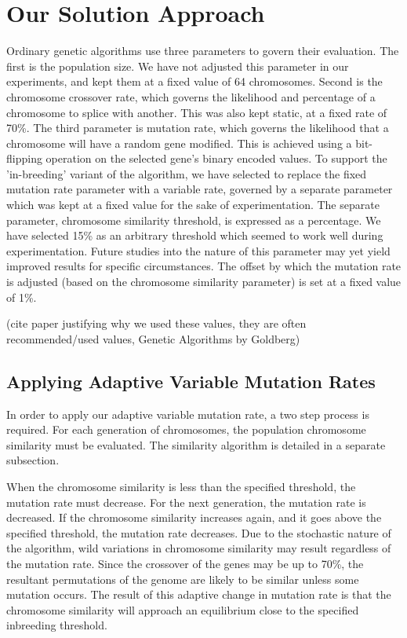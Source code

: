 \documentclass{sig-alternate}
\begin{document}
% 
%
\section{Our Solution Approach}\label{params}
Ordinary genetic algorithms use three parameters to govern their evaluation. The first is the population size. We have not adjusted this parameter in our experiments, and kept them at a fixed value of 64 chromosomes. Second is the chromosome crossover rate, which governs the likelihood and percentage of a chromosome to splice with another. This was also kept static, at a fixed rate of 70\%. The third parameter is mutation rate, which governs the likelihood that a chromosome will have a random gene modified. This is achieved using a bit-flipping operation on the selected gene's binary encoded values. To support the 'in-breeding' variant of the algorithm, we have selected to replace the fixed mutation rate parameter with a variable rate, governed by a separate parameter which was kept at a fixed value for the sake of experimentation. The separate parameter, chromosome similarity threshold, is expressed as a percentage. We have selected 15\% as an arbitrary threshold which seemed to work well during experimentation. Future studies into the nature of this parameter may yet yield improved results for specific circumstances. The offset by which the mutation rate is adjusted (based on the chromosome similarity parameter) is set at a fixed value of 1\%.

(cite paper justifying why we used these values, they are often recommended/used values, Genetic Algorithms by Goldberg)


\subsection{Applying Adaptive Variable Mutation Rates}
In order to apply our adaptive variable mutation rate, a two step process is required. For each generation of chromosomes, the population chromosome similarity must be evaluated. The similarity algorithm is detailed in a separate subsection.  

When the chromosome similarity is less than the specified threshold, the mutation rate must decrease. For the next generation, the mutation rate is decreased. If the chromosome similarity increases again, and it goes above the specified threshold, the mutation rate decreases. Due to the stochastic nature of the algorithm, wild variations in chromosome similarity may result regardless of the mutation rate. Since the crossover of the genes may be up to 70\%, the resultant permutations of the genome are likely to be similar unless some mutation occurs. The result of this adaptive change in mutation rate is that the chromosome similarity will approach an equilibrium close to the specified inbreeding threshold.
\end{document}
